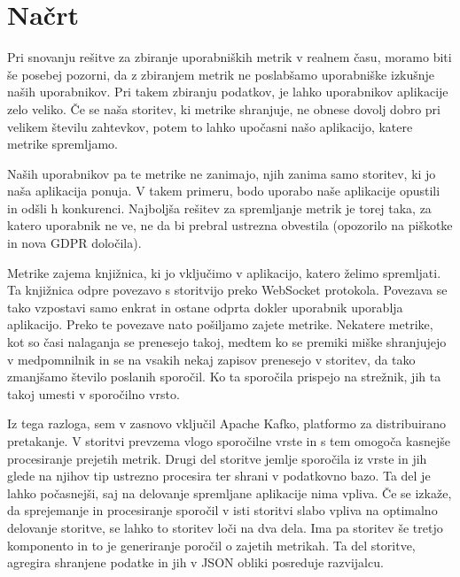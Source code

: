 \documentclass[a4paper, 12pt]{book}
\begin{document}
\section{Načrt}
\label{ch3:sec1}

Pri snovanju rešitve za zbiranje uporabniških metrik v realnem času, moramo biti še posebej pozorni, da z zbiranjem metrik ne poslabšamo uporabniške izkušnje naših uporabnikov. Pri takem zbiranju podatkov, je lahko uporabnikov aplikacije zelo veliko. Če se naša storitev, ki metrike shranjuje, ne obnese dovolj dobro pri velikem številu zahtevkov, potem to lahko upočasni našo aplikacijo, katere metrike spremljamo.

Naših uporabnikov pa te metrike ne zanimajo, njih zanima samo storitev, ki jo naša aplikacija ponuja.  V takem primeru, bodo uporabo naše aplikacije opustili in odšli h konkurenci. Najboljša rešitev za spremljanje metrik je torej taka, za katero uporabnik ne ve, ne da bi prebral ustrezna obvestila (opozorilo na piškotke in nova GDPR določila).

Metrike zajema knjižnica, ki jo vključimo v aplikacijo, katero želimo spremljati. Ta knjižnica odpre povezavo s storitvijo preko WebSocket protokola. Povezava se tako vzpostavi samo enkrat in ostane odprta dokler uporabnik uporablja aplikacijo. Preko te povezave nato pošiljamo zajete metrike. Nekatere metrike, kot so časi nalaganja se prenesejo takoj, medtem ko se premiki miške shranjujejo v medpomnilnik in se na vsakih nekaj zapisov prenesejo v storitev, da tako zmanjšamo število poslanih sporočil. Ko ta sporočila prispejo na strežnik, jih ta takoj umesti v sporočilno vrsto.

Iz tega razloga, sem v zasnovo vključil Apache Kafko, platformo za distribuirano pretakanje. V storitvi prevzema vlogo sporočilne vrste in s tem omogoča kasnejše procesiranje prejetih metrik. Drugi del storitve jemlje sporočila iz vrste in jih glede na njihov tip ustrezno procesira ter shrani v podatkovno bazo. Ta del je lahko počasnejši, saj na delovanje spremljane aplikacije nima vpliva. Če se izkaže, da sprejemanje in procesiranje sporočil v isti storitvi slabo vpliva na optimalno delovanje storitve, se lahko to storitev loči na dva dela. Ima pa storitev še tretjo komponento in to je generiranje poročil o zajetih metrikah. Ta del storitve, agregira shranjene podatke in jih v JSON obliki posreduje razvijalcu.
\end{document}
